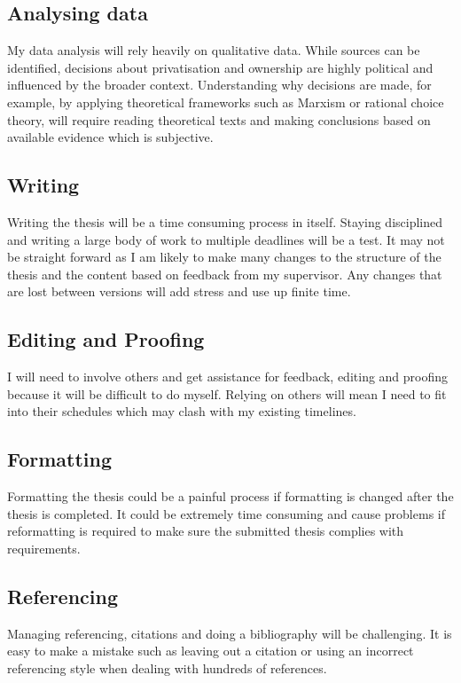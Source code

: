 \documentclass{article}
\begin{document}
\subsection*{Analysing data}
My data analysis will rely heavily on qualitative data. While sources can be identified, decisions about privatisation and ownership are highly political and influenced by the broader context. Understanding why decisions are made, for example, by applying theoretical frameworks such as Marxism or rational choice theory, will require reading theoretical texts and making conclusions based on available evidence which is subjective.\par
\subsection*{Writing}
Writing the thesis will be a time consuming process in itself. Staying disciplined and writing a large body of work to multiple deadlines will be a test. It may not be straight forward as I am likely to make many changes to the structure of the thesis and the content based on feedback from my supervisor. Any changes that are lost between versions will add stress and use up finite time.\par
\subsection*{Editing and Proofing}
I will need to involve others and get assistance for feedback, editing and proofing because it will be difficult to do myself. Relying on others will mean I need to fit into their schedules which may clash with my existing timelines.\par
\subsection*{Formatting}
Formatting the thesis could be a painful process if formatting is changed after the thesis is completed. It could be extremely time consuming and cause problems if reformatting is required to make sure the submitted thesis complies with requirements.\par
\subsection*{Referencing}
Managing referencing, citations and doing a bibliography will be challenging. It is easy to make a mistake such as leaving out a citation or using an incorrect referencing style when dealing with hundreds of references.\par 
\end{document}
